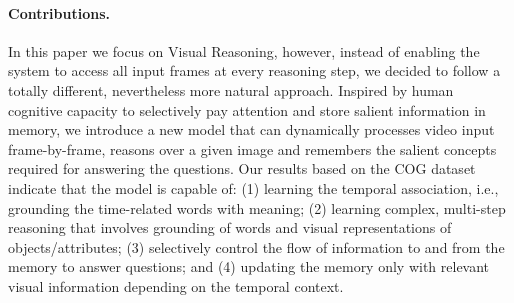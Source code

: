 \paragraph{Contributions.}
In this paper we focus on Visual Reasoning, however, instead of enabling the system to access all input frames at every reasoning step, we decided to follow a totally different, nevertheless more natural approach.
Inspired by human cognitive capacity to selectively pay attention and store salient information in memory,
we introduce a new model that can dynamically processes video input frame-by-frame, reasons over a given image and remembers the salient concepts required for answering the questions.
Our results based on the COG dataset \cite{yang2018dataset} indicate that the model is capable of:
(1) learning the temporal association, i.e., grounding the time-related words with meaning;
(2) learning complex, multi-step reasoning that involves grounding of words and visual representations of objects/attributes;
(3) selectively control the flow of information to and from the memory to answer questions; and
(4) updating the memory only with relevant visual information depending on the temporal context.
%
